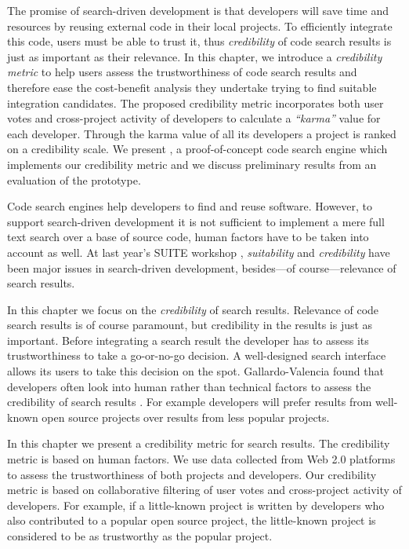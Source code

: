 \asteriskasteriskasterisk

The promise of search-driven development is that developers will save time and resources by reusing external code in their local projects. To efficiently integrate this code, users must be able to trust it, thus \emph{credibility} of code search results is just as important as their relevance. 
%
In this chapter, we introduce a \emph{credibility metric} to help users assess the trustworthiness of code search results and therefore ease the cost-benefit analysis they undertake trying to find suitable integration candidates. The proposed credibility metric incorporates both user votes and cross-project activity of developers to calculate a \emph{``karma''} value for each developer. Through the karma value of all its developers a project is ranked on a credibility scale.
%
We present \Jbd, a proof-of-concept code search engine which implements our credibility metric and we discuss preliminary results from an evaluation of the prototype.

Code search engines help developers to find and reuse software. However, to support search-driven development it is not sufficient to implement a mere full text search over a base of source code, human factors have to be taken into account as well. At last year's SUITE workshop \cite{Kuhn09a}, \emph{suitability} and \emph{credibility} have been major issues in search-driven development, besides---of course---relevance of search results.  

In this chapter we focus on the \emph{credibility} of search results. Relevance of code search results is of course paramount, but credibility in the results is just as important. Before integrating a search result the developer has to assess its trustworthiness to take a go-or-no-go decision. A well-designed search interface allows its users to take this decision on the spot. Gallardo-Valencia \etal found that developers often look into human rather than technical factors to assess the credibility of search results \cite{Gall09a}. For example developers will prefer results from well-known open source projects over results from less popular projects.

In this chapter we present a credibility metric for search results. The credibility metric is based on human factors. We use data collected from Web 2.0 platforms to assess the trustworthiness of both projects and developers. Our credibility metric is based on collaborative filtering of user votes and cross-project activity of developers. For example, if a little-known project is written by developers who also contributed to a popular open source project, the little-known project is considered to be as trustworthy as the popular project. 


